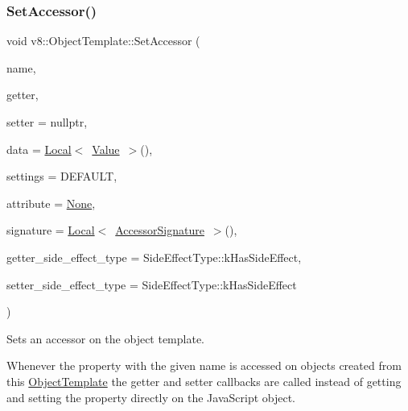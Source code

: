 \subsubsection{\texorpdfstring{Set\+Accessor()}{SetAccessor()}}
{\footnotesize\ttfamily void v8\+::\+Object\+Template\+::\+Set\+Accessor (\begin{DoxyParamCaption}\item[{\mbox{\hyperlink{classv8_1_1Local}{Local}}$<$ \mbox{\hyperlink{classv8_1_1String}{String}} $>$}]{name,  }\item[{\mbox{\hyperlink{namespacev8_a722613c87061708a4f1aa050d095f868}{Accessor\+Getter\+Callback}}}]{getter,  }\item[{Accessor\+Setter\+Callback}]{setter = {\ttfamily nullptr},  }\item[{\mbox{\hyperlink{classv8_1_1Local}{Local}}$<$ \mbox{\hyperlink{classv8_1_1Value}{Value}} $>$}]{data = {\ttfamily \mbox{\hyperlink{classv8_1_1Local}{Local}}$<$~\mbox{\hyperlink{classv8_1_1Value}{Value}}~$>$()},  }\item[{\mbox{\hyperlink{namespacev8_a31d8355cb043d7d2dda3f4a52760b64e}{Access\+Control}}}]{settings = {\ttfamily DEFAULT},  }\item[{\mbox{\hyperlink{namespacev8_a05f25f935e108a1ea2d150e274602b87}{Property\+Attribute}}}]{attribute = {\ttfamily \mbox{\hyperlink{namespacev8_a05f25f935e108a1ea2d150e274602b87a7ab4d58719c33b3ea2dfaefa29b111df}{None}}},  }\item[{\mbox{\hyperlink{classv8_1_1Local}{Local}}$<$ \mbox{\hyperlink{classv8_1_1AccessorSignature}{Accessor\+Signature}} $>$}]{signature = {\ttfamily \mbox{\hyperlink{classv8_1_1Local}{Local}}$<$~\mbox{\hyperlink{classv8_1_1AccessorSignature}{Accessor\+Signature}}~$>$()},  }\item[{\mbox{\hyperlink{namespacev8_a29711319c2b9fc7716d65faee2f7b9cb}{Side\+Effect\+Type}}}]{getter\+\_\+side\+\_\+effect\+\_\+type = {\ttfamily SideEffectType\+:\+:kHasSideEffect},  }\item[{\mbox{\hyperlink{namespacev8_a29711319c2b9fc7716d65faee2f7b9cb}{Side\+Effect\+Type}}}]{setter\+\_\+side\+\_\+effect\+\_\+type = {\ttfamily SideEffectType\+:\+:kHasSideEffect} }\end{DoxyParamCaption})}

Sets an accessor on the object template.

Whenever the property with the given name is accessed on objects created from this \mbox{\hyperlink{classv8_1_1ObjectTemplate}{Object\+Template}} the getter and setter callbacks are called instead of getting and setting the property directly on the Java\+Script object.


